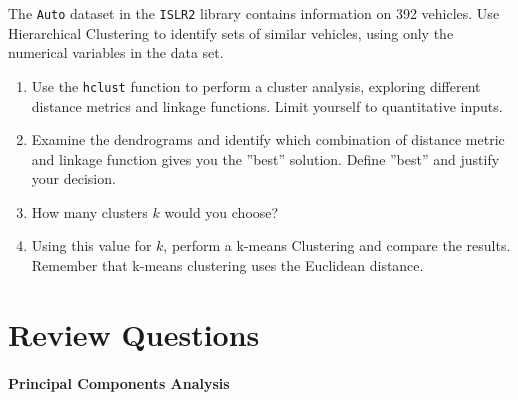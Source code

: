 \begin{withcode}
\begin{exerciseboxcomputer}
The \texttt{Auto} dataset in the \texttt{ISLR2} library contains information on 392 vehicles. Use Hierarchical Clustering to identify sets of similar vehicles, using only the numerical variables in the data set.

\begin{enumerate}
   \item Use the \texttt{hclust} function to perform a cluster analysis, exploring different distance metrics and linkage functions. Limit yourself to quantitative inputs.
   \item Examine the dendrograms and identify which combination of distance metric and linkage function gives you the ''best'' solution. Define ''best'' and justify your decision.
   \item How many clusters $k$ would you choose?
   \item Using this value for $k$, perform a k-means Clustering and compare the results. Remember that k-means clustering uses the Euclidean distance.
\end{enumerate}
\end{exerciseboxcomputer}
\end{withcode}

\section{Review Questions}

\paragraph*{Principal Components Analysis}

